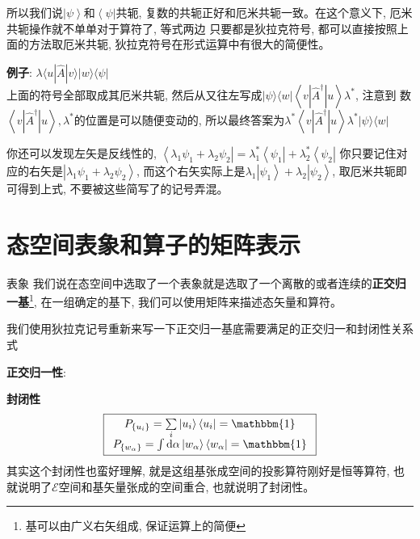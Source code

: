 所以我们说$\left|\psi\right\rangle$和$\left\langle \psi \right|$共轭, 复数的共轭正好和厄米共轭一致。在这个意义下, 厄米共轭操作就不单单对于算符了, 等式两边
只要都是狄拉克符号, 都可以直接按照上面的方法取厄米共轭, 狄拉克符号在形式运算中有很大的简便性。
\begin{thinknote}
    \textbf{例子}:  $\lambda\langle u|\hat{A}| v\rangle|w\rangle\langle\psi|$\\
    上面的符号全部取成其厄米共轭, 然后从又往左写成$|\psi\rangle\langle w|\left\langle v\left|\hat{A}^{\dagger}\right| u\right\rangle \lambda^{*}$, 注意到
    数$\left\langle v\left|\hat{A}^{\dagger}\right| u\right\rangle,\lambda^{*}$的位置是可以随便变动的, 所以最终答案为$\lambda^{*}\left\langle v\left|\hat{A}^{\dagger}\right| u\right\rangle\lambda^{*}|\psi\rangle\langle w|$
\end{thinknote}
你还可以发现左矢是反线性的, $\left\langle\lambda_1\psi_1+\lambda_2\psi_2\right| =\lambda_1^*\left\langle\psi_1\right|+\lambda_2^*\left\langle\psi_2\right|$
你只要记住对应的右矢是$\left|\lambda_1\psi_1+\lambda_2\psi_2\right\rangle$, 而这个右矢实际上是$\lambda_1\left|\psi_1\right\rangle+\lambda_2\left|\psi_2\right\rangle $, 取厄米共轭即可得到上式, 不要被这些简写了的记号弄混。

\section{态空间表象和算子的矩阵表示}
\begin{define}{表象}
    我们说在态空间中选取了一个表象就是选取了一个离散的或者连续的\textbf{正交归一基}\footnote[1]{基可以由广义右矢组成, 保证运算上的简便}, 在一组确定的基下, 我们可以使用矩阵来描述态矢量和算符。
\end{define}
我们使用狄拉克记号重新来写一下正交归一基底需要满足的正交归一和封闭性关系式

\textbf{正交归一性}:
\begin{lequation}
\end{lequation}

\textbf{封闭性}
\begin{equation}
    \boxed{
        \begin{array}{c}
            P_{\{u_i\}}=\sum\limits _{i}\left | u_i  \right \rangle \left\langle u_i\right|= \mathbbm{1}\\
            P_{\{w_\alpha \}}=\int \mathrm{d}\alpha \left | w_\alpha   \right \rangle \left\langle  w_\alpha \right |=\mathbbm{1}
        \end{array}
    }
\end{equation}
其实这个封闭性也蛮好理解, 就是这组基张成空间的投影算符刚好是恒等算符, 也就说明了$\mathscr{E}$空间和基矢量张成的空间重合, 也就说明了封闭性。

